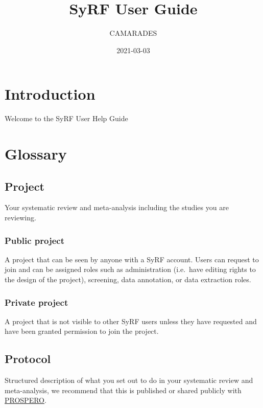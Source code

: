 \documentclass[]{book}
\title{SyRF User Guide}
\author{CAMARADES}
\date{2021-03-03}
\begin{document}
\maketitle

{
\setcounter{tocdepth}{1}
\tableofcontents
}
\chapter{Introduction}\label{intro}

Welcome to the SyRF User Help Guide

\chapter{Glossary}\label{glossary}

\section{Project}\label{project}

Your systematic review and meta-analysis including the studies you are
reviewing.

\subsection{Public project}\label{public-project}

A project that can be seen by anyone with a SyRF account. Users can
request to join and can be assigned roles such as administration
(i.e.~have editing rights to the design of the project), screening, data
annotation, or data extraction roles.

\subsection{Private project}\label{private-project}

A project that is not visible to other SyRF users unless they have
requested and have been granted permission to join the project.

\section{Protocol}\label{protocol}

Structured description of what you set out to do in your systematic
review and meta-analysis, we recommend that this is published or shared
publicly with \href{https://www.crd.york.ac.uk/prospero/}{PROSPERO}.
\end{document}
